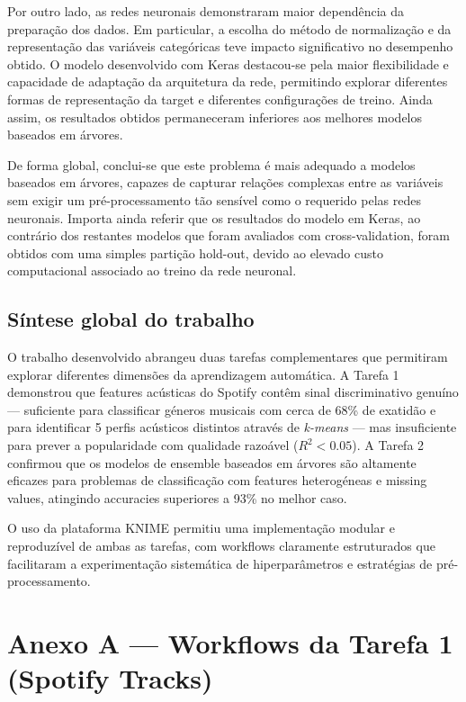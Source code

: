 \documentclass[11pt,a4paper]{article}
\begin{document}
Por outro lado, as redes neuronais demonstraram maior dependência da preparação dos dados. Em particular, a escolha do método de normalização e da representação das variáveis categóricas teve impacto significativo no desempenho obtido. O modelo desenvolvido com Keras destacou-se pela maior flexibilidade e capacidade de adaptação da arquitetura da rede, permitindo explorar diferentes formas de representação da target e diferentes configurações de treino. Ainda assim, os resultados obtidos permaneceram inferiores aos melhores modelos baseados em árvores.

De forma global, conclui-se que este problema é mais adequado a modelos baseados em árvores, capazes de capturar relações complexas entre as variáveis sem exigir um pré-processamento tão sensível como o requerido pelas redes neuronais. Importa ainda referir que os resultados do modelo em Keras, ao contrário dos restantes modelos que foram avaliados com cross-validation, foram obtidos com uma simples partição hold-out, devido ao elevado custo computacional associado ao treino da rede neuronal.

\subsection{Síntese global do trabalho}

O trabalho desenvolvido abrangeu duas tarefas complementares que permitiram explorar diferentes dimensões da aprendizagem automática. A Tarefa 1 demonstrou que features acústicas do Spotify contêm sinal discriminativo genuíno --- suficiente para classificar géneros musicais com cerca de 68\% de exatidão e para identificar 5 perfis acústicos distintos através de \textit{k-means} --- mas insuficiente para prever a popularidade com qualidade razoável ($R^2 < 0.05$). A Tarefa 2 confirmou que os modelos de ensemble baseados em árvores são altamente eficazes para problemas de classificação com features heterogéneas e missing values, atingindo accuracies superiores a 93\% no melhor caso.

O uso da plataforma KNIME permitiu uma implementação modular e reproduzível de ambas as tarefas, com workflows claramente estruturados que facilitaram a experimentação sistemática de hiperparâmetros e estratégias de pré-processamento.

\clearpage
\appendix
{}

\section{Anexo A — Workflows da Tarefa 1 (Spotify Tracks)}
\end{document}
